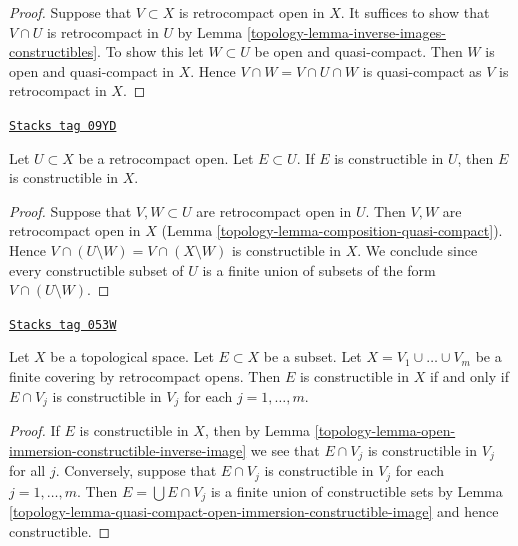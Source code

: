 \begin{proof}

Suppose that $V \subset X$ is retrocompact open in $X$.
It suffices to show that $V \cap U$ is retrocompact in $U$
by Lemma \ref{topology-lemma-inverse-images-constructibles}. To show this
let $W \subset U$ be open and quasi-compact. Then $W$
is open and quasi-compact in $X$. Hence $V \cap W = V \cap U \cap W$
is quasi-compact as $V$ is retrocompact in $X$.
\end{proof}

\begin{lemma}
\label{topology-lemma-quasi-compact-open-immersion-constructible-image}
\href{https://stacks.math.columbia.edu/tag/09YD}{\texttt{Stacks tag 09YD}}

Let $U \subset X$ be a retrocompact open. Let $E \subset U$.
If $E$ is constructible in $U$, then $E$ is constructible in $X$.
\end{lemma}

\begin{proof}

Suppose that $V, W \subset U$ are retrocompact open in $U$.
Then $V, W$ are retrocompact open in $X$
(Lemma \ref{topology-lemma-composition-quasi-compact}).
Hence $V \cap (U \setminus W) = V \cap (X \setminus W)$
is constructible in $X$. We conclude since every constructible subset of $U$
is a finite union of subsets of the form $V \cap (U \setminus W)$.
\end{proof}

\begin{lemma}
\label{topology-lemma-collate-constructible}
\href{https://stacks.math.columbia.edu/tag/053W}{\texttt{Stacks tag 053W}}

Let $X$ be a topological space. Let $E \subset X$ be a subset.
Let $X = V_1 \cup \ldots \cup V_m$ be a finite covering by
retrocompact opens.
Then $E$ is constructible in $X$ if and only if $E \cap V_j$
is constructible in $V_j$ for each $j = 1, \ldots, m$.
\end{lemma}

\begin{proof}

If $E$ is constructible in $X$, then by
Lemma \ref{topology-lemma-open-immersion-constructible-inverse-image}
we see that $E \cap V_j$ is constructible in $V_j$ for all $j$.
Conversely, suppose that $E \cap V_j$
is constructible in $V_j$ for each $j = 1, \ldots, m$.
Then $E = \bigcup E \cap V_j$ is a finite union of
constructible sets by
Lemma \ref{topology-lemma-quasi-compact-open-immersion-constructible-image}
and hence constructible.
\end{proof}

